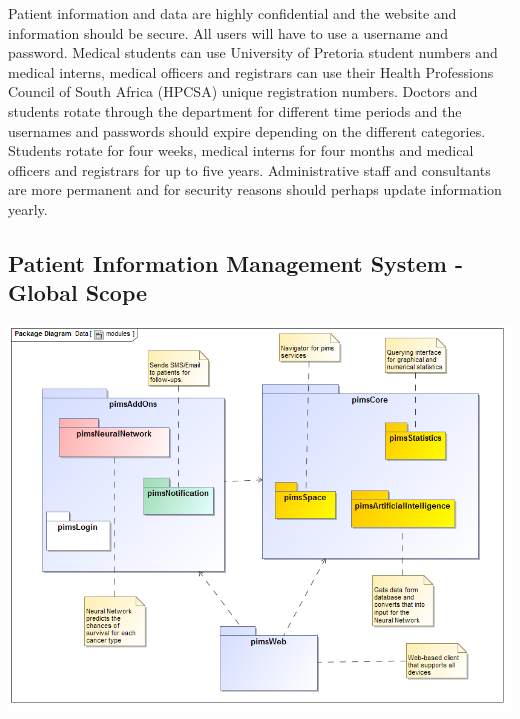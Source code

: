 Patient  information  and  data  are  highly  confidential  and  the  website  and 
information  should  be  secure.  All  users  will  have  to  use  a  username  and 
password. Medical students can use University of Pretoria student numbers and 
medical interns, medical officers and registrars can use their Health Professions 
Council  of  South  Africa  (HPCSA)  unique  registration  numbers.  Doctors  and 
students  rotate  through  the  department  for  different  time  periods  and  the 
usernames and passwords should expire depending on the different categories. 
Students  rotate  for  four  weeks,  medical  interns  for  four  months  and medical 
officers and registrars  for  up  to  five  years.  Administrative  staff  and  consultants 
are more permanent and for security reasons should perhaps update information 
yearly. \par


\subsection{Patient Information Management System - Global Scope}
\includegraphics[width=\linewidth]{./Graphics/globalImages/modules}
\pagebreak